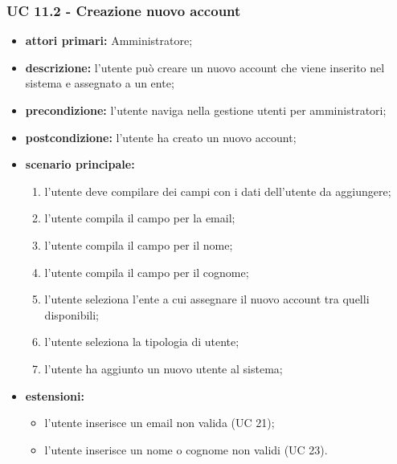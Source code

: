 			\subsubsection{UC 11.2 - Creazione nuovo account}
			\begin{itemize}
				\item \textbf{attori primari:} Amministratore;
				\item \textbf{descrizione:} l'utente può creare un nuovo account che viene inserito nel sistema e assegnato a un ente;
				\item \textbf{precondizione:} l'utente naviga nella gestione utenti per amministratori;
				\item \textbf{postcondizione:} l'utente ha creato un nuovo account;
				\item \textbf{scenario principale:}
				\begin{enumerate}
					\item{l'utente deve compilare dei campi con i dati dell'utente da aggiungere;}
					\item{l'utente compila il campo per la email;}
					\item{l'utente compila il campo per il nome;}
					\item{l'utente compila il campo per il cognome;}
					\item{l'utente seleziona l'ente a cui assegnare il nuovo account tra quelli disponibili;}
					\item{l'utente seleziona la tipologia di utente;}
					\item{l'utente ha aggiunto un nuovo utente al sistema;}
				\end{enumerate}	
				\item \textbf{estensioni:}
				\begin{itemize}
					\item l'utente inserisce un email non valida (UC 21);
					\item l'utente inserisce un nome o cognome non validi (UC 23).
				\end{itemize}
			\end{itemize}
			

